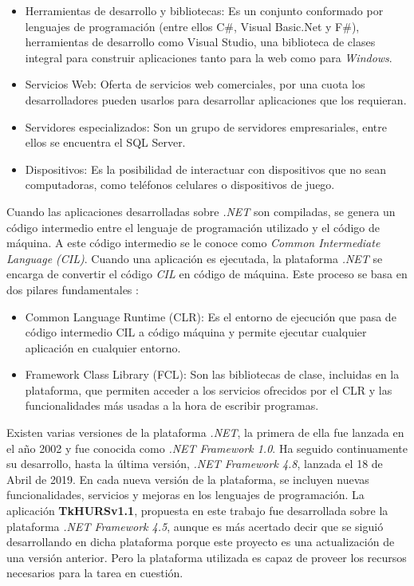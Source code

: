 \begin{itemize}
\item  Herramientas de desarrollo y bibliotecas: Es un conjunto conformado por lenguajes de programación (entre ellos C\#, Visual Basic.Net y F\#), herramientas de desarrollo como Visual Studio, una biblioteca de clases integral para construir aplicaciones tanto para la web como para \textit{Windows}.

\item Servicios Web: Oferta de servicios web comerciales, por una cuota los desarrolladores pueden usarlos para desarrollar aplicaciones que los requieran.

\item Servidores especializados: Son un grupo de servidores empresariales, entre ellos se encuentra el SQL Server.

\item Dispositivos: Es la posibilidad de interactuar con dispositivos que no sean computadoras, como teléfonos celulares o dispositivos de juego.
\end{itemize}


Cuando las aplicaciones desarrolladas sobre \textit{.NET} son compiladas, se genera un código intermedio entre el lenguaje de programación utilizado y el código de máquina. A este código intermedio se le conoce como \textit{Common Intermediate Language (CIL)}. Cuando una aplicación es ejecutada, la plataforma \textit{.NET} se encarga de convertir el código \textit{CIL} en código de máquina. Este proceso se basa en dos pilares fundamentales \cite{DK2, DK8}:  

\begin{itemize}
\item  Common Language Runtime (CLR): Es el entorno de ejecución que pasa de código intermedio CIL a código máquina y permite ejecutar cualquier aplicación en cualquier entorno.

\item Framework Class Library (FCL): Son las bibliotecas de clase, incluidas en la plataforma, que permiten acceder a los servicios ofrecidos por el CLR y las funcionalidades más usadas a la hora de escribir programas.
\end{itemize}

Existen varias versiones de la plataforma \textit{.NET}, la primera de ella fue lanzada en el año 2002 y fue conocida como \textit{.NET Framework 1.0}. Ha seguido continuamente su desarrollo, hasta la última versión, \textit{.NET Framework 4.8}, lanzada el 18 de Abril de 2019\cite{DK8}. En cada nueva versión de la plataforma, se incluyen nuevas funcionalidades, servicios y mejoras en los lenguajes de programación. La aplicación \textbf{TkHURSv1.1}, propuesta en este trabajo fue desarrollada sobre la plataforma \textit{.NET Framework 4.5}, aunque es más acertado decir que se siguió desarrollando en dicha plataforma porque este proyecto es una actualización de una versión anterior. Pero la plataforma utilizada es capaz de proveer los recursos necesarios para la tarea en cuestión.%

